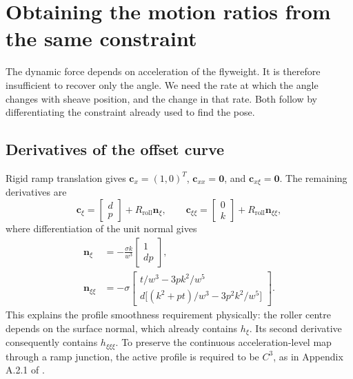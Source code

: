 \documentclass[11pt,letterpaper]{article}
\numberwithin{equation}{section}
\begin{document}
\section{Obtaining the motion ratios from the same constraint}
\label{sec:kinematics}

The dynamic force depends on acceleration of the flyweight. It is therefore insufficient to recover only the angle. We need the rate at which the angle changes with sheave position, and the change in that rate. Both follow by differentiating the constraint already used to find the pose.

\subsection{Derivatives of the offset curve}

Rigid ramp translation gives $\bm c_x=(1,0)^T$, $\bm c_{xx}=\bm0$, and $\bm c_{x\xi}=\bm0$. The remaining derivatives are
\begin{equation}
  \bm c_{\xi}=\begin{bmatrix}d\\p\end{bmatrix}
                 +R_{\mathrm{roll}}\bm n_{\xi},
  \qquad
  \bm c_{\xi\xi}=\begin{bmatrix}0\\k\end{bmatrix}
                 +R_{\mathrm{roll}}\bm n_{\xi\xi},
  \label{eq:offset-derivatives}
\end{equation}
where differentiation of the unit normal gives
\begin{align}
  \bm n_{\xi}
    &=-\frac{\sigma k}{w^3}\begin{bmatrix}1\\dp\end{bmatrix},\label{eq:normal-first}\\
  \bm n_{\xi\xi}
    &=-\sigma\begin{bmatrix}
       t/w^3-3pk^2/w^5\\
       d\bigl[(k^2+pt)/w^3-3p^2k^2/w^5\bigr]
       \end{bmatrix}.
       \label{eq:normal-second}
\end{align}
This explains the profile smoothness requirement physically: the roller centre depends on the surface normal, which already contains $h_{\xi}$. Its second derivative consequently contains $h_{\xi\xi\xi}$. To preserve the continuous acceleration-level map through a ramp junction, the active profile is required to be $C^3$, as in Appendix A.2.1 of \cite{formulation}.
\end{document}
